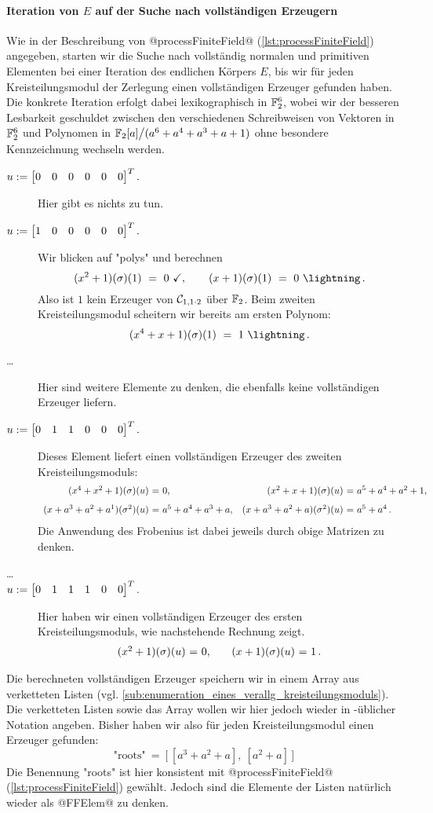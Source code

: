 \paragraph{Iteration von $E$ auf der Suche nach vollständigen Erzeugern}
Wie in der Beschreibung von @processFiniteField@
(\autoref{lst:processFiniteField}) angegeben, starten wir die Suche nach
vollständig normalen und primitiven Elementen bei einer Iteration des endlichen
Körpers $E$, bis wir für jeden Kreisteilungsmodul der Zerlegung einen
vollständigen Erzeuger gefunden haben. Die konkrete Iteration erfolgt dabei
lexikographisch in $\F_2^6$, wobei wir der besseren Lesbarkeit geschuldet
zwischen den verschiedenen Schreibweisen von Vektoren in $\F_2^6$ und
Polynomen in $\F_2[a]\big/(a^6 + a^4 + a^3 + a + 1)$ ohne besondere
Kennzeichnung wechseln werden.
\begin{description}
  \item[$u := \vec{0&0&0&0&0&0}^T.$] Hier gibt es nichts zu tun.
  \item[$u := \vec{1&0&0&0&0&0}^T.$] Wir blicken auf "polys" und berechnen
    \[ (x^2+1)(\sigma)(1) \speq= 0\ \checkmark,
    \qquad (x+1)(\sigma)(1) \speq= 0\ \lightning\,.\]
    Also ist $1$ kein Erzeuger von $\C_{1,1\cdot 2}$ über $\F_2$.
    Beim zweiten Kreisteilungsmodul scheitern wir bereits am ersten Polynom:
    \[ (x^4+x+1)(\sigma)(1) \speq= 1\ \lightning\,.\]
  \item[\ldots] Hier sind weitere Elemente zu denken, die ebenfalls keine 
    vollständigen Erzeuger liefern.
  \item[$u := \vec{0&1&1&0&0&0}^T.$] Dieses Element liefert einen vollständigen
    Erzeuger des zweiten Kreisteilungsmoduls:
    \[\begin{array}{r@{\ =\ }l@{\quad}r@{\ =\ }l} 
      (x^4+x^2+1)(\sigma)(u) & 0, &
      (x^2+x+1)(\sigma)(u) & a^5+a^4+a^2+1, \\[8pt]
      (x+a^3+a^2+a^1)(\sigma^2)(u) & a^5 + a^4 + a^3 + a, &
      (x+a^3+a^2+a)(\sigma^2)(u) & a^5+a^4\,.
      \end{array}\]
    Die Anwendung des Frobenius ist dabei jeweils durch obige Matrizen zu
    denken.
  \item[\ldots]
  \item[$u := \vec{0&1&1&1&0&0}^T.$] Hier haben wir einen vollständigen Erzeuger
    des ersten Kreisteilungsmoduls, wie nachstehende Rechnung zeigt.
    \[\begin{array}{r@{\ =\ }l@{\qquad}r@{\ =\ }l} 
      (x^2+1)(\sigma)(u) & 0, &
      (x+1)(\sigma)(u) & 1\,.
      \end{array}\]
\end{description}
Die berechneten vollständigen Erzeuger speichern wir in einem Array aus
verketteten Listen (vgl.
\autoref{sub:enumeration_eines_verallg_kreisteilungsmoduls}). Die verketteten
Listen sowie das Array wollen wir hier jedoch wieder in \python-üblicher 
Notation angeben. Bisher haben wir also für jeden Kreisteilungsmodul einen
Erzeuger gefunden:
\[ \text{"roots"}\ =\ \big[\, [a^3+a^2+a],\ [a^2+a] \,\big]\]
Die Benennung "roots" ist hier konsistent mit @processFiniteField@
(\autoref{lst:processFiniteField}) gewählt. Jedoch sind die Elemente der Listen
natürlich wieder als @FFElem@ zu denken.


